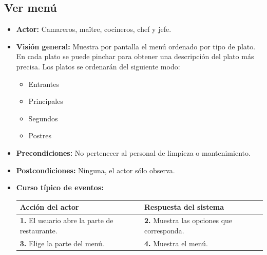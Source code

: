 \documentclass[spanish,a4paper,11pt, twoside]{report}	%
\begin{document}
 	
	\subsection{Ver menú}
			\begin{itemize}
			\item \textbf{Actor:} Camareros, maître, cocineros, chef y jefe.
			\item \textbf{Visión general:} Muestra por pantalla el menú ordenado por tipo de plato. En cada plato se puede pinchar para obtener una descripción del plato más precisa. Los platos se ordenarán del siguiente modo:
			\begin{itemize}
				\item 	 Entrantes
				\item 	 Principales
				\item 	 Segundos
				\item 	 Postres
				\end {itemize}
			\item \textbf{Precondiciones:} No pertenecer al personal de limpieza o mantenimiento.
			\item \textbf{Postcondiciones:} Ninguna, el actor sólo observa.
			\item \textbf{Curso típico de eventos:} 	\\
				\begin{tabular}{|p{6cm}||p{6cm}|}
				\hline
				\textbf{Acción del actor} & \textbf{Respuesta del sistema} \\ \hline \hline
				\textbf{1.} El usuario abre la parte de restaurante. & \textbf{2.} Muestra las opciones que corresponda.\\ \hline 
				\textbf{3.} Elige la parte del menú. & \textbf{4.} Muestra el menú. \\ \hline
			\end{tabular}
		\end {itemize}



\end{document}
